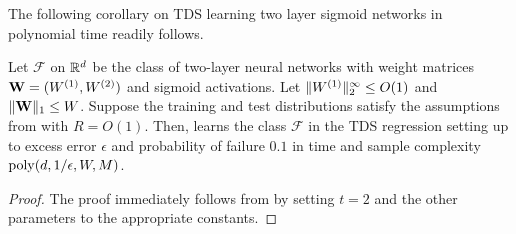 The following corollary on TDS learning two layer sigmoid networks in polynomial time readily follows. 
\begin{corollary}
\label{clry:polytime_tds_sigmoid_appendix}
    Let $\mathcal{F}$ on $\mathbb{R}^{d}$ be the class of two-layer neural networks with weight matrices $\mathbf{W}=(W^{(1)},W^{(2)})$ and sigmoid activations. Let $\|W^{(1)}\|_{2}^{\infty}\leq O(1)$ and $\|\mathbf{W}\|_1\leq W$. Suppose the training and test distributions satisfy the assumptions from  with $R=O(1)$. Then,  learns the class $\mathcal{F}$ in the TDS regression setting up to excess error $\epsilon$ and probability of failure $0.1$ in time and sample complexity $\mathrm{poly}(d,1/\epsilon,W,M)$.
\end{corollary}
\begin{proof}
    The proof immediately follows from  by setting $t=2$ and the other parameters to the appropriate constants.
\end{proof}


